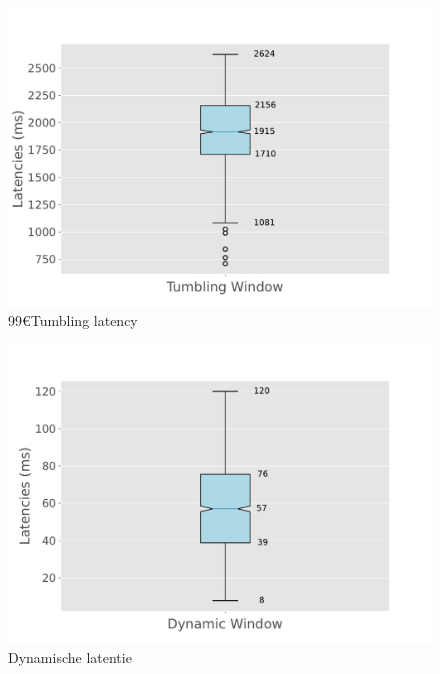     \\
    \begin{subfigure}[b]{0.5\columnwidth}
        \includegraphics[width=\columnwidth]{fig/constant-rate/TumblingWindow_latency_boxplot.pdf}
        99€{Tumbling latency}
        \label{fig:constant_tumb_boxplot}
    \end{subfigure}
    \begin{subfigure}[b]{0.5\columnwidth}
        \includegraphics[width=\columnwidth]{fig/constant-rate/DynamicWindow_latency_boxplot.pdf}
        \caption{Dynamische latentie}
        \label{fig:constant_dynamic_boxplot}
    \end{subfigure}
    \\
